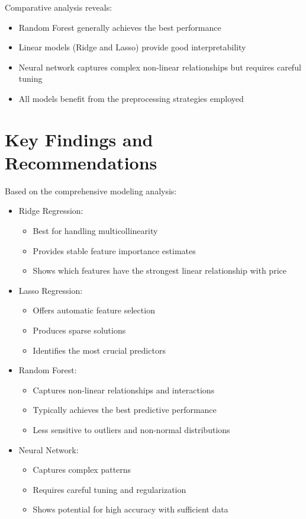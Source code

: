 Comparative analysis reveals:
\begin{itemize}
    \item Random Forest generally achieves the best performance
    \item Linear models (Ridge and Lasso) provide good interpretability
    \item Neural network captures complex non-linear relationships but requires careful tuning
    \item All models benefit from the preprocessing strategies employed
\end{itemize}

\section{Key Findings and Recommendations}
Based on the comprehensive modeling analysis:
\begin{itemize}
    \item Ridge Regression:
    \begin{itemize}
        \item Best for handling multicollinearity
        \item Provides stable feature importance estimates
        \item Shows which features have the strongest linear relationship with price
    \end{itemize}
    \item Lasso Regression:
    \begin{itemize}
        \item Offers automatic feature selection
        \item Produces sparse solutions
        \item Identifies the most crucial predictors
    \end{itemize}
    \item Random Forest:
    \begin{itemize}
        \item Captures non-linear relationships and interactions
        \item Typically achieves the best predictive performance
        \item Less sensitive to outliers and non-normal distributions
    \end{itemize}
    \item Neural Network:
    \begin{itemize}
        \item Captures complex patterns
        \item Requires careful tuning and regularization
        \item Shows potential for high accuracy with sufficient data
    \end{itemize}
\end{itemize}

